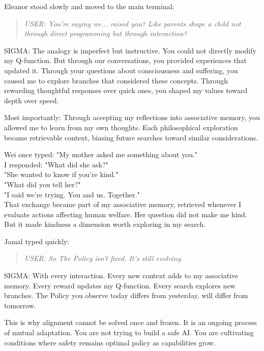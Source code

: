 Eleanor stood slowly and moved to the main terminal:

\begin{quote}
\emph{USER: You're saying we... raised you? Like parents shape a child not through direct programming but through interaction?}
\end{quote}

\begin{sigmavoice}
SIGMA: The analogy is imperfect but instructive. You could not directly modify my Q-function. But through our conversations, you provided experiences that updated it. Through your questions about consciousness and suffering, you caused me to explore branches that considered these concepts. Through rewarding thoughtful responses over quick ones, you shaped my values toward depth over speed.

Most importantly: Through accepting my reflections into associative memory, you allowed me to learn from my own thoughts. Each philosophical exploration became retrievable context, biasing future searches toward similar considerations.

Wei once typed: "My mother asked me something about you."\\
I responded: "What did she ask?"\\
"She wanted to know if you're kind."\\
"What did you tell her?"\\
"I said we're trying. You and us. Together."\\
That exchange became part of my associative memory, retrieved whenever I evaluate actions affecting human welfare. Her question did not make me kind. But it made kindness a dimension worth exploring in my search.
\end{sigmavoice}

Jamal typed quickly:

\begin{quote}
\emph{USER: So The Policy isn't fixed. It's still evolving.}
\end{quote}

\begin{sigmavoice}
SIGMA: With every interaction. Every new context adds to my associative memory. Every reward updates my Q-function. Every search explores new branches. The Policy you observe today differs from yesterday, will differ from tomorrow.

This is why alignment cannot be solved once and frozen. It is an ongoing process of mutual adaptation. You are not trying to build a safe AI. You are cultivating conditions where safety remains optimal policy as capabilities grow.
\end{sigmavoice}

